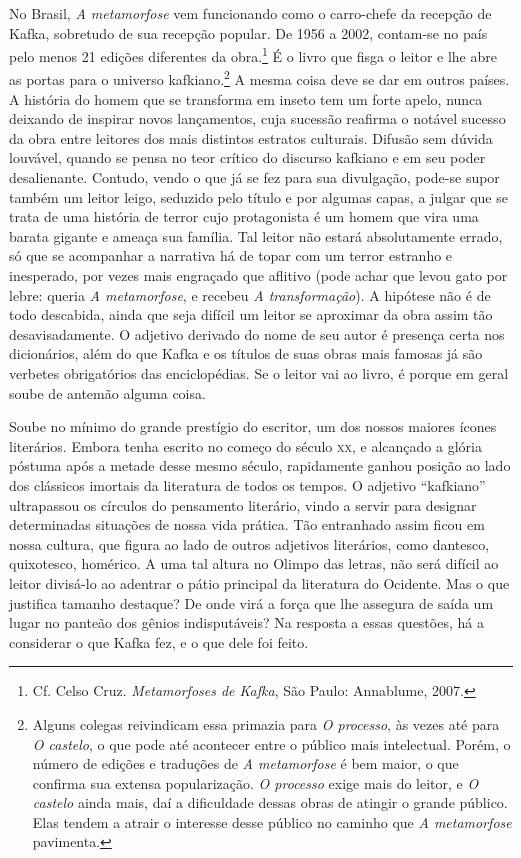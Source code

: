 No Brasil, \textit{A metamorfose} vem funcionando como o carro-chefe
da recepção de Kafka, sobretudo de sua recepção popular. De 1956 a
2002, contam-se no país pelo menos 21 edições diferentes da
obra.\footnote{ Cf. Celso Cruz. \textit{Metamorfoses de Kafka}, São
Paulo: Annablume, 2007.} É o livro que fisga o leitor e lhe abre as
portas para o universo kafkiano.\footnote{ Alguns colegas reivindicam
essa primazia para \textit{O processo}, às vezes até para \textit{O
castelo}, o que pode até acontecer entre o público mais intelectual.
Porém, o número de edições e traduções de \textit{A metamorfose} é bem
maior, o que confirma sua extensa popularização. \textit{O processo}
exige mais do leitor, e \textit{O castelo} ainda mais, daí a
dificuldade dessas obras de atingir o grande público. Elas tendem a
atrair o interesse desse público no caminho que \textit{A metamorfose}
pavimenta.} A mesma coisa deve se dar em outros países. A história do
homem que se transforma em inseto tem um forte apelo, nunca deixando de
inspirar novos lançamentos, cuja sucessão reafirma o notável sucesso da
obra entre leitores dos mais distintos estratos culturais. Difusão sem
dúvida louvável, quando se pensa no teor crítico do discurso kafkiano e
em seu poder desalienante. Contudo, vendo o que já se fez para sua
divulgação, pode-se supor também um leitor leigo, seduzido pelo
título e por algumas capas, a julgar que se trata de uma história de
terror cujo protagonista é um homem que vira uma barata gigante e
ameaça sua família. Tal leitor não estará absolutamente errado, só que
se acompanhar a narrativa há de topar com um terror estranho e
inesperado, por vezes mais engraçado que aflitivo (pode achar que
levou gato por lebre: queria \textit{A metamorfose}, e recebeu
\textit{A transformação}). A hipótese não é de todo descabida, ainda
que seja difícil um leitor se aproximar da obra assim tão
desavisadamente. O adjetivo derivado do nome de seu autor é presença
certa nos dicionários, além do que Kafka e os títulos de suas obras
mais famosas já são verbetes obrigatórios das enciclopédias. Se o
leitor vai ao livro, é porque em geral soube de antemão alguma coisa.

Soube no mínimo do grande prestígio do escritor, um dos nossos maiores
ícones literários. Embora tenha escrito no começo do século \textsc{xx}, e
alcançado a glória póstuma após a metade desse mesmo século,
rapidamente ganhou posição ao lado dos clássicos imortais da literatura
de todos os tempos. O adjetivo “kafkiano” ultrapassou os círculos do
pensamento literário, vindo a servir para designar determinadas
situações de nossa vida prática. Tão entranhado assim ficou em nossa
cultura, que figura ao lado de outros adjetivos literários, como dantesco, quixotesco,
homérico. A uma tal altura no Olimpo das letras, não será difícil ao
leitor divisá-lo ao adentrar o pátio principal da literatura do
Ocidente. Mas o que justifica tamanho destaque? De onde virá a força
que lhe assegura de saída um lugar no panteão dos gênios indisputáveis?
Na resposta a essas questões, há a considerar o que Kafka fez, e o que
dele foi feito.

